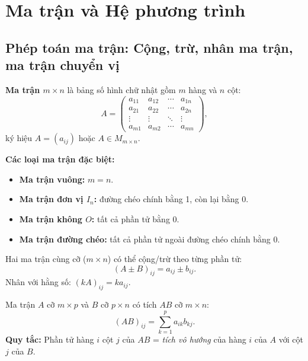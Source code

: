 \documentclass[12pt,a4paper]{article}
\begin{document}
\section{Ma trận và Hệ phương trình}

\subsection{Phép toán ma trận: Cộng, trừ, nhân ma trận, ma trận chuyển vị}

\begin{dinhnghia}[title={Ma trận}]
  \textbf{Ma trận $m \times n$} là bảng số hình chữ nhật gồm $m$ hàng và $n$ cột:
  \[
    A = \begin{pmatrix} a_{11} & a_{12} & \cdots & a_{1n} \\ a_{21} & a_{22} & \cdots & a_{2n} \\ \vdots & \vdots & \ddots & \vdots \\ a_{m1} & a_{m2} & \cdots & a_{mn} \end{pmatrix},
  \]
  ký hiệu $A = (a_{ij})$ hoặc $A \in M_{m\times n}$.

  \textbf{Các loại ma trận đặc biệt:}
  \begin{itemize}
    \item \textbf{Ma trận vuông:} $m = n$.
    \item \textbf{Ma trận đơn vị $I_n$:} đường chéo chính bằng 1, còn lại bằng 0.
    \item \textbf{Ma trận không $O$:} tất cả phần tử bằng 0.
    \item \textbf{Ma trận đường chéo:} tất cả phần tử ngoài đường chéo chính bằng 0.
  \end{itemize}
\end{dinhnghia}

\begin{congthuc}[title={Cộng và trừ ma trận}]
  Hai ma trận cùng cỡ ($m \times n$) có thể cộng/trừ theo từng phần tử:
  \[
    (A \pm B)_{ij} = a_{ij} \pm b_{ij}.
  \]
  Nhân với hằng số: $(kA)_{ij} = k a_{ij}$.
\end{congthuc}

\begin{congthuc}[title={Nhân ma trận}]
  Ma trận $A$ cỡ $m \times p$ và $B$ cỡ $p \times n$ có tích $AB$ cỡ $m \times n$:
  \[
    (AB)_{ij} = \sum_{k=1}^p a_{ik} b_{kj}.
  \]
  \textbf{Quy tắc:} Phần tử hàng $i$ cột $j$ của $AB$ = \textit{tích vô hướng} của hàng $i$ của $A$ với cột $j$ của $B$.
\end{congthuc}
\end{document}
